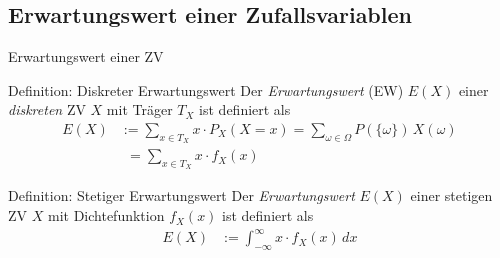 \documentclass[
  10pt,
  ignorenonframetext,
]{beamer}
\begin{document}
\hypertarget{erwartungswert-einer-zufallsvariablen}{%
\subsection{Erwartungswert einer
Zufallsvariablen}\label{erwartungswert-einer-zufallsvariablen}}

\begin{frame}{Erwartungswert einer ZV}
\protect\hypertarget{erwartungswert-einer-zv}{}
\begin{block}{Definition: Diskreter Erwartungswert}
\protect\hypertarget{definition-diskreter-erwartungswert}{}
Der \emph{Erwartungswert} (EW) \(E(X)\) einer \emph{diskreten} ZV \(X\)
mit Träger \(T_X\) ist definiert als \begin{align*}
E(X) &:= \sum_{x \in T_X} x \cdot P_{X}(X = x) = \sum_{\omega \in \Omega} P(\{\omega\}) \, X(\omega)\\
      &\phantom{:}=\sum_{x \in T_X} x \cdot f_X(x)
\end{align*}
\end{block}

\begin{block}{Definition: Stetiger Erwartungswert}
\protect\hypertarget{definition-stetiger-erwartungswert}{}
Der \emph{Erwartungswert} \(E(X)\) einer stetigen ZV \(X\) mit
Dichtefunktion \(f_X(x)\) ist definiert als \begin{align*}
E(X) &:= \int_{-\infty}^\infty x \cdot f_X(x) \,dx
\end{align*}
\end{block}
\end{frame}
\end{document}
